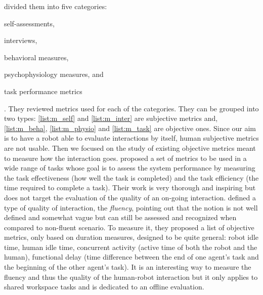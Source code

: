 \documentclass[a4paper,11pt,twoside]{StyleThese}
\begin{document}
\cite{bethel_2010_review} divided them into five categories: \begin{inlineEnumerate}
	\item self-assessments,\label{list:m_self}
	\item interviews,\label{list:m_inter}
	\item behavioral measures,\label{list:m_beha}
	\item psychophysiology measures, and\label{list:m_physio}
	\item task performance metrics\label{list:m_task}
\end{inlineEnumerate}. They reviewed metrics used for each of the categories. They can be grouped into two types: \ref{list:m_self} and \ref{list:m_inter} are subjective metrics and, \ref{list:m_beha}, \ref{list:m_physio} and \ref{list:m_task} are objective ones. Since our aim is to have a robot able to evaluate interactions by itself, human subjective metrics are not usable. Then we focused on the study of existing objective metrics meant to measure how the interaction goes. \cite{steinfeld_2006_common} proposed a set of metrics to be used in a wide range of tasks whose goal is to assess the system performance by measuring the task effectiveness (\ie how well the task is completed) and the task efficiency (\ie the time required to complete a task). Their work is very thorough and inspiring but does not target the evaluation of the quality of an on-going interaction. 
\cite{hoffman2019} defined a type of quality of interaction, the \textit{fluency}, pointing out that the notion is not well defined and somewhat vague but can still be assessed and recognized when compared to non-fluent scenario. To measure it, they proposed a list of objective metrics, only based on duration measures, designed to be quite general: robot idle time, human idle time, concurrent activity (\ie active time of both the robot and the human), functional delay (\ie time difference between the end of one agent’s task and the beginning of the other agent’s task). It is an interesting way to measure the fluency and thus the quality of the human-robot interaction but it only applies to shared workspace tasks and is dedicated to an offline evaluation.
\end{document}
